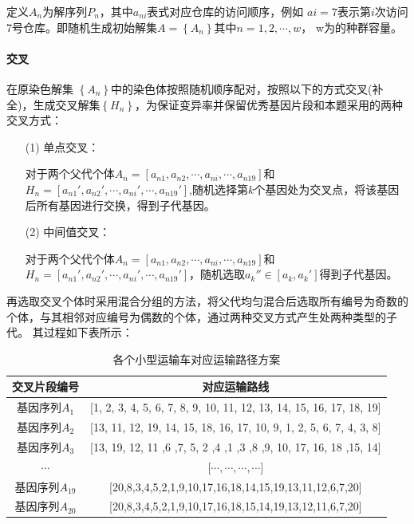 \documentclass{whutmod}
\begin{document}
        定义$A_n$为解序列$P_{n}$，其中$a_{ni}$表式对应仓库的访问顺序，例如 $a{i}=7$表示第$i$次访问7号仓库。即随机生成初始解集$A=\left \{A_n\right \}$其中$n=1,2,\cdots,w$， w为的种群容量。
        
        \paragraph{交叉}
        在原染色解集 $\left \{ A_n \right \}$中的染色体按照随机顺序配对，按照以下的方式交叉(补全)，生成交叉解集$\left \{H_n\right \}$，为保证变异率并保留优秀基因片段和本题采用的两种交叉方式：
        
        \begin{itemize}
        	\item [(1)]单点交叉：
        	
        	对于两个父代个体$ A_n=[a_{n1},a_{n2},\cdots,a_{ni},\cdots,a_{n19}]$和$H_n=[a_{n1}',a_{n2}',\cdots,a_{ni}',\cdots,a_{n19}']$,随机选择第$k$个基因处为交叉点，将该基因后所有基因进行交换，得到子代基因。
        	\item [(2)]中间值交叉：
        	
        	对于两个父代个体$ A_n=[a_{n1},a_{n2},\cdots,a_{ni},\cdots,a_{n19}]$和	$H_n=[a_{n1}',a_{n2}',\cdots,a_{ni}',\cdots,a_{n19}']$，随机选取$a_{k}''\in [a_{k},a_{k}']$得到子代基因。
        \end{itemize}
        再选取交叉个体时采用混合分组的方法，将父代均匀混合后选取所有编号为奇数的个体，与其相邻对应编号为偶数的个体，通过两种交叉方式产生处两种类型的子代。
    	其过程如下表所示：
    	  	\begin{table}[H]
    		\centering		\caption{各个小型运输车对应运输路径方案}\label{zhuansasgggggzai}
    		\begin{tabular}{cc}
    			\toprule[2pt]
    			\multicolumn{1}{m{3cm}}{\centering 交叉片段编号}
    			& \multicolumn{1}{m{8cm}}{\centering 对应运输路线}
    			\\
    			\midrule[1pt]
    			基因序列$A_1$ &  [1,	2,	3,	4,	5,	6,	7,	8,	9,	10,	11,	12,	13,	14,	15,	16,	17,	18,	19] \\ 
    			基因序列$A_2$ &  [13,	11,	12,	19,	14,	15,	18,	16,	17,	10,	9,	1,	2,	5,	6,	7,	4,	3,	8] \\ 
    			基因序列$A_3$ &  [13,	19,	12,	11	,6	,7,	5,	2	,4	,1	,3	,8	,9,	10,	17,	16,	18	,15,	14] \\ 
    			$\cdots$ & [$\cdots, \cdots, \cdots, \cdots$] \\ 
    			基因序列$A_{19}$ &  [20,8,3,4,5,2,1,9,10,17,16,18,14,15,19,13,11,12,6,7,20]\\ 
    			基因序列$A_{20}$ &  [20,8,3,4,5,2,1,9,10,17,16,18,15,14,19,13,12,11,6,7,20] \\ 
    			\bottomrule[2pt]	
    		\end{tabular}
    	\end{table}
    	
\end{document}
